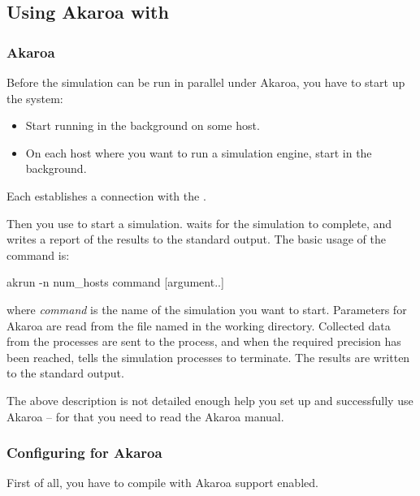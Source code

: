 \subsection{Using Akaroa with {\opp}}
\label{sec:run-sim:using-akaroa}

\subsubsection{Akaroa}
\label{sec:run-sim:starting-up-akaroa}

Before the simulation can be run in parallel under Akaroa, you have to
start up the system:

\begin{itemize}
  \item{Start  running in the background on some host.}
  \item{On each host where you want to run a simulation engine,
     start  in the background.}
\end{itemize}

Each  establishes a connection with the .

Then you use  to start a simulation.  waits
for the simulation to complete, and writes a report of the results
to the standard output. The basic usage of the  command is:

\begin{commandline}
akrun -n num_hosts command [argument..]
\end{commandline}

where \textit{command} is the name of the simulation you want to start.
Parameters for Akaroa are read from the file named  in
the working directory. Collected data from the processes are
sent to the  process, and when the required precision
has been reached,  tells the simulation processes to
terminate. The results are written to the standard output.

The above description is not detailed enough help you
set up and successfully use Akaroa -- for that you need to read the
Akaroa manual.

\subsubsection{Configuring {\opp} for Akaroa}
\label{sec:run-sim:configuring-akaroa}

First of all, you have to compile {\opp} with Akaroa support enabled.

